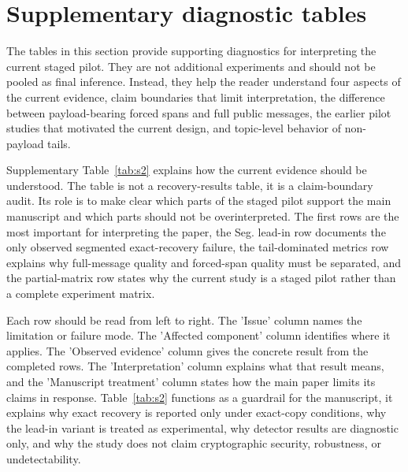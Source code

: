 \documentclass[fleqn,10pt]{wlscirep}
\begin{document}
\section*{Supplementary diagnostic tables}

The tables in this section provide supporting diagnostics for interpreting the current staged pilot. They are not additional experiments and should not be pooled as final inference. Instead, they help the reader understand four aspects of the current evidence, claim boundaries that limit interpretation, the difference between payload-bearing forced spans and full public messages, the earlier pilot studies that motivated the current design, and topic-level behavior of non-payload tails.

Supplementary Table~\ref{tab:s2} explains how the current evidence should be understood. The table is not a recovery-results table, it is a claim-boundary audit. Its role is to make clear which parts of the staged pilot support the main manuscript and which parts should not be overinterpreted. The first rows are the most important for interpreting the paper, the Seg. lead-in row documents the only observed segmented exact-recovery failure, the tail-dominated metrics row explains why full-message quality and forced-span quality must be separated, and the partial-matrix row states why the current study is a staged pilot rather than a complete experiment matrix.

Each row should be read from left to right. The 'Issue' column names the limitation or failure mode. The 'Affected component' column identifies where it applies. The 'Observed evidence' column gives the concrete result from the completed rows. The 'Interpretation' column explains what that result means, and the 'Manuscript treatment' column states how the main paper limits its claims in response. Table~\ref{tab:s2} functions as a guardrail for the manuscript, it explains why exact recovery is reported only under exact-copy conditions, why the lead-in variant is treated as experimental, why detector results are diagnostic only, and why the study does not claim cryptographic security, robustness, or undetectability.
\end{document}
